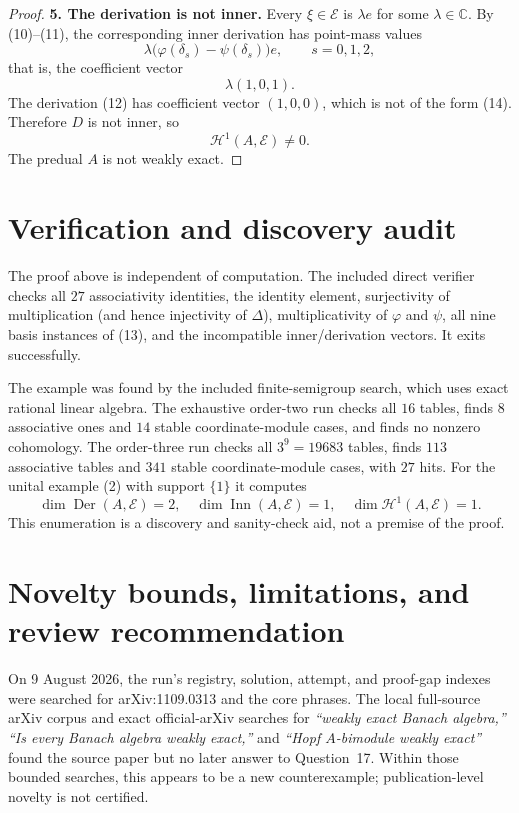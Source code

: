 \documentclass[11pt]{article}
\newcommand{\C}{\mathbb C}
\newcommand{\E}{\mathcal E}
\newcommand{\1}{\mathbf 1}
\begin{document}
\begin{proof}
\smallskip
\noindent\textbf{5. The derivation is not inner.}
Every $\xi\in\E$ is $\lambda e$ for some $\lambda\in\C$.  By
(10)--(11), the corresponding inner derivation has point-mass values
\[
 \lambda\bigl(\varphi(\delta_s)-\psi(\delta_s)\bigr)e,
 \qquad s=0,1,2,
\]
that is, the coefficient vector
\[
  \lambda(1,0,1).
\tag{14}
\]
The derivation (12) has coefficient vector $(1,0,0)$, which is not of the
form (14).  Therefore $D$ is not inner, so
\[
  \mathcal H^1(A,\E)\ne0.
\]
The predual $A$ is not weakly exact.
\end{proof}

\section{Verification and discovery audit}

The proof above is independent of computation.  The included direct verifier
checks all $27$ associativity
identities, the identity element, surjectivity of multiplication (and hence
injectivity of $\Delta$), multiplicativity of $\varphi$ and $\psi$, all nine
basis instances of (13), and the incompatible inner/derivation vectors.
It exits successfully.

The example was found by the included finite-semigroup search, which uses
exact rational linear algebra.  The exhaustive order-two run checks all $16$ tables, finds
$8$ associative ones and $14$ stable coordinate-module cases, and finds no
nonzero cohomology.  The order-three run checks all $3^9=19683$ tables,
finds $113$ associative tables and $341$ stable coordinate-module cases,
with $27$ hits.  For the unital example (2) with support $\{1\}$ it computes
\[
  \dim\operatorname{Der}(A,\E)=2,
  \quad
  \dim\operatorname{Inn}(A,\E)=1,
  \quad
  \dim\mathcal H^1(A,\E)=1.
\]
This enumeration is a discovery and sanity-check aid, not a premise of the
proof.

\section{Novelty bounds, limitations, and review recommendation}

On 9 August 2026, the run's registry, solution, attempt, and proof-gap
indexes were searched for arXiv:1109.0313 and the core phrases.  The local
full-source arXiv corpus and exact official-arXiv searches for
\emph{``weakly exact Banach algebra,''}
\emph{``Is every Banach algebra weakly exact,''} and
\emph{``Hopf $A$-bimodule weakly exact''} found the source paper but no later
answer to Question~17.  Within those bounded searches, this appears to be a
new counterexample; publication-level novelty is not certified.
\end{document}
